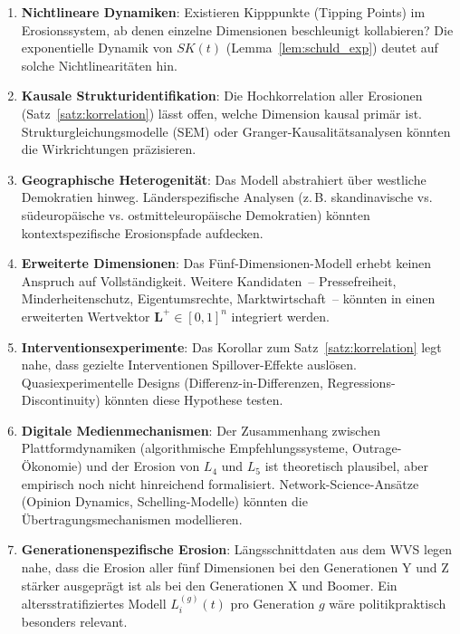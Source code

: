 ﻿\documentclass[a4paper,12pt]{article}
\theoremstyle{definition}
\begin{document}
\begin{enumerate}
	\item \textbf{Nichtlineare Dynamiken}: Existieren Kipppunkte (Tipping Points) im Erosionssystem, ab denen einzelne Dimensionen beschleunigt kollabieren? Die exponentielle Dynamik von $SK(t)$ (Lemma~\ref{lem:schuld_exp}) deutet auf solche Nichtlinearitäten hin.
	
	\item \textbf{Kausale Strukturidentifikation}: Die Hochkorrelation aller Erosionen (Satz~\ref{satz:korrelation}) lässt offen, welche Dimension kausal primär ist. Strukturgleichungsmodelle (SEM) oder Granger-Kausalitätsanalysen könnten die Wirkrichtungen präzisieren.
	
	\item \textbf{Geographische Heterogenität}: Das Modell abstrahiert über westliche Demokratien hinweg. Länderspezifische Analysen (z.\,B. skandinavische vs. südeuropäische vs. ostmitteleuropäische Demokratien) könnten kontextspezifische Erosionspfade aufdecken.
	
	\item \textbf{Erweiterte Dimensionen}: Das Fünf-Dimensionen-Modell erhebt keinen Anspruch auf Vollständigkeit. Weitere Kandidaten~-- Pressefreiheit, Minderheitenschutz, Eigentumsrechte, Marktwirtschaft~-- könnten in einen erweiterten Wertvektor $\mathbf{L}^+ \in [0,1]^n$ integriert werden.
	
	\item \textbf{Interventionsexperimente}: Das Korollar zum Satz~\ref{satz:korrelation} legt nahe, dass gezielte Interventionen Spillover-Effekte auslösen. Quasiexperimentelle Designs (Differenz-in-Differenzen, Regressions-Discontinuity) könnten diese Hypothese testen.
	
	\item \textbf{Digitale Medienmechanismen}: Der Zusammenhang zwischen Plattformdynamiken (algorithmische Empfehlungssysteme, Outrage-Ökonomie) und der Erosion von $L_4$ und $L_5$ ist theoretisch plausibel, aber empirisch noch nicht hinreichend formalisiert. Network-Science-Ansätze (Opinion Dynamics, Schelling-Modelle) könnten die Übertragungsmechanismen modellieren.
	
	\item \textbf{Generationenspezifische Erosion}: Längsschnittdaten aus dem WVS legen nahe, dass die Erosion aller fünf Dimensionen bei den Generationen Y und Z stärker ausgeprägt ist als bei den Generationen X und Boomer. Ein altersstratifiziertes Modell $L_i^{(g)}(t)$ pro Generation $g$ wäre politikpraktisch besonders relevant.
	

\end{enumerate}
\end{document}
